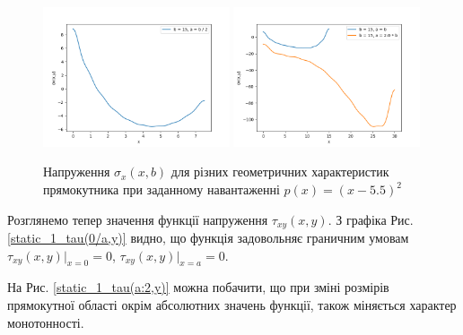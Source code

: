 \begin{figure}[H]
    \begin{center}
        \includegraphics[width=0.49\textwidth, scale=1]{images/results/static_1/sigma_x(x,b)1.png}
        \includegraphics[width=0.49\textwidth, scale=1]{images/results/static_1/sigma_x(x,b)2.png}
        \caption{Напруження $\sigma_x(x, b)$ для різних геометричних характеристик прямокутника при заданному навантаженні $p(x) = (x - 5.5)^2$}\label{static_1_sigma_x(x,b)}
    \end{center}
\end{figure}

Розглянемо тепер значення функції напруження $\tau_{xy}(x,y)$. З графіка Рис. \ref{static_1_tau(0/a,y)} видно, що
функція задовольняє граничним умовам $\tau_{xy}(x,y) |_{x=0}=0$, $\tau_{xy}(x,y) |_{x=a}=0$.

На Рис. \ref{static_1_tau(a:2,y)} можна побачити, що при зміні розмірів прямокутної області окрім абсолютних значень функції,
також міняється характер монотонності.

